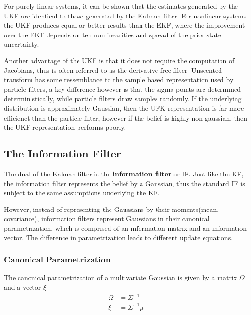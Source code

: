 \vspace{2mm}

For purely linear systems, it can be shown that the estimates generated by the UKF are identical to those generated by the Kalman filter.
For nonlinear systems the UKF produces equal or better results than the EKF, where the improvement over the EKF depends on teh nonlinearities and spread of the prior state uncertainty.

Another advantage of the UKF is that it does not require the computation of Jacobians, thus is often referred to as the derivative-free filter.
Unscented transform has some ressemblance to the sample based representation used by particle filters, a key difference however is that the sigma points are determined deterministically, while particle filters draw samples randomly.
If the underlying distribution is approximately Gaussian, then the UFK representation is far more efficienct than the particle filter, however if the belief is highly non-gaussian, then the UKF representation performs poorly.

\newpage

\subsection{The Information Filter}

The dual of the Kalman filter is the \textbf{information filter} or IF.
Just like the KF, the information filter represents the belief by a Gaussian, thus the standard IF is subject to the same assumptions underlying the KF.

However, instead of representing the Gaussians by their moments(mean, covariance), information filters represent Gaussians in their canonical parametrization, which is comprised of an information matrix and an information vector.
The difference in parametrization leads to different update equations.

\subsubsection{Canonical Parametrization}

The canonical parametrization of a multivariate Gaussian is given by a matrix $ \Omega$ and a vector $\xi$
\begin{align}
  \Omega &= \Sigma^{-1} \\
  \xi &= \Sigma^{-1} \mu \\
\end{align}

